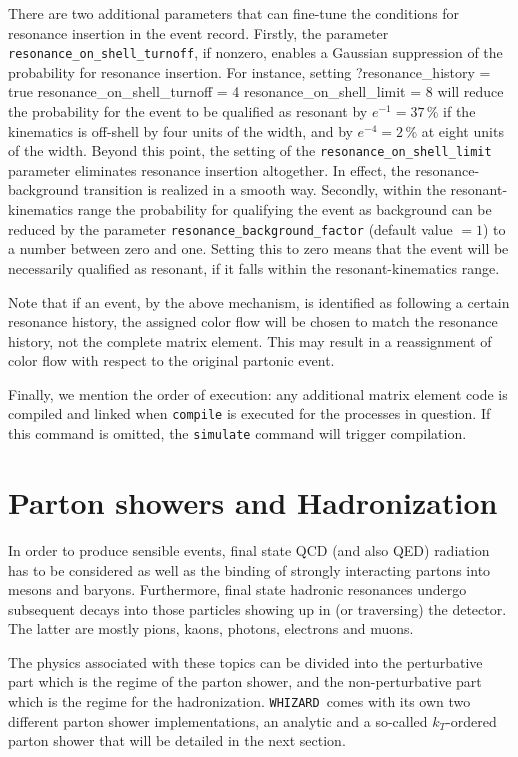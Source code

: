 \documentclass[12pt]{book}
\newenvironment{Code}%
  {\begingroup\footnotesize
   \quote
   \Verbatim[frame=single]}%
  {\endVerbatim
   \endquote
   \endgroup\noindent}
\newcommand{\ttt}[1]{\texttt{#1}}
\newcommand{\whizard}{\ttt{WHIZARD}}
\begin{document}
There are two additional parameters that can fine-tune the conditions for
resonance insertion in the event record.  Firstly, the parameter
\verb|resonance_on_shell_turnoff|, if nonzero, enables a Gaussian suppression
of the probability for resonance insertion.  For instance, setting
\begin{Code}
  ?resonance_history = true
  resonance_on_shell_turnoff = 4
  resonance_on_shell_limit = 8
\end{Code}
will reduce the probability for the event to be qualified as resonant by
$e^{-1}= 37\,\%$ if the kinematics is off-shell by four units of the width,
and by $e^{-4}=2\,\%$ at eight units of the width.  Beyond this point, the
setting of the \verb|resonance_on_shell_limit| parameter eliminates resonance
insertion altogether.  In effect, the resonance-background transition is
realized in a smooth way.  Secondly, within the resonant-kinematics range the
probability for qualifying the event as background can be reduced by the
parameter \verb|resonance_background_factor| (default value $=1$) to a number
between zero and one.  Setting this to zero means that the event will be
necessarily qualified as resonant, if it falls within the resonant-kinematics
range.

Note that if an event, by the above mechanism, is identified as following a
certain resonance history, the assigned color flow will be chosen to match the
resonance history, not the complete matrix element.  This may result in a
reassignment of color flow with respect to the original partonic event.

Finally, we mention the order of execution: any additional
matrix element code is compiled and linked when \verb|compile| is
executed for the processes in question.  If this command is omitted,
the \verb|simulate| command will trigger compilation.


\section{Parton showers and Hadronization}

In order to produce sensible events, final state QCD (and also QED)
radiation has to be considered as well as the binding of strongly
interacting partons into mesons and baryons. Furthermore, final state
hadronic resonances undergo subsequent decays into those particles
showing up in (or traversing) the detector. The latter are mostly
pions, kaons, photons, electrons and muons.

The physics associated with these topics can be divided into the
perturbative part which is the regime of the parton shower, and the
non-perturbative part which is the regime for the
hadronization. \whizard\ comes with its own two different parton
shower implementations, an analytic and a so-called $k_T$-ordered
parton shower that will be detailed in the next section.
\end{document}

